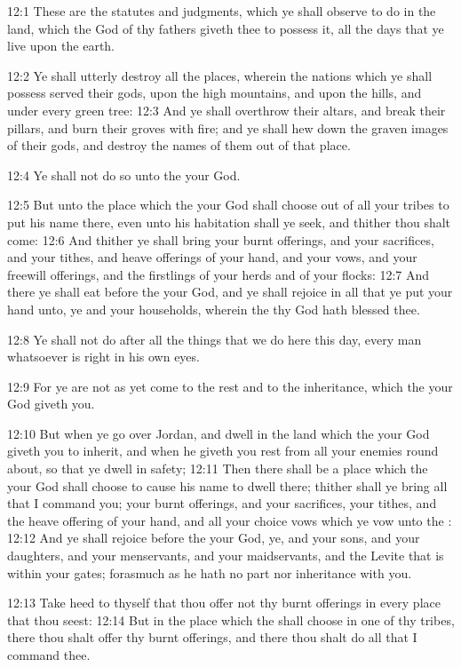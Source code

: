 12:1 These are the statutes and judgments, which ye shall observe to do in the land, which the \LORD God of thy fathers giveth thee to possess it, all the days that ye live upon the earth.

12:2 Ye shall utterly destroy all the places, wherein the nations which ye shall possess served their gods, upon the high mountains, and upon the hills, and under every green tree: 12:3 And ye shall overthrow their altars, and break their pillars, and burn their groves with fire; and ye shall hew down the graven images of their gods, and destroy the names of them out of that place.

12:4 Ye shall not do so unto the \LORD your God.

12:5 But unto the place which the \LORD your God shall choose out of all your tribes to put his name there, even unto his habitation shall ye seek, and thither thou shalt come: 12:6 And thither ye shall bring your burnt offerings, and your sacrifices, and your tithes, and heave offerings of your hand, and your vows, and your freewill offerings, and the firstlings of your herds and of your flocks: 12:7 And there ye shall eat before the \LORD your God, and ye shall rejoice in all that ye put your hand unto, ye and your households, wherein the \LORD thy God hath blessed thee.

12:8 Ye shall not do after all the things that we do here this day, every man whatsoever is right in his own eyes.

12:9 For ye are not as yet come to the rest and to the inheritance, which the \LORD your God giveth you.

12:10 But when ye go over Jordan, and dwell in the land which the \LORD your God giveth you to inherit, and when he giveth you rest from all your enemies round about, so that ye dwell in safety; 12:11 Then there shall be a place which the \LORD your God shall choose to cause his name to dwell there; thither shall ye bring all that I command you; your burnt offerings, and your sacrifices, your tithes, and the heave offering of your hand, and all your choice vows which ye vow unto the \LORD: 12:12 And ye shall rejoice before the \LORD your God, ye, and your sons, and your daughters, and your menservants, and your maidservants, and the Levite that is within your gates; forasmuch as he hath no part nor inheritance with you.

12:13 Take heed to thyself that thou offer not thy burnt offerings in every place that thou seest: 12:14 But in the place which the \LORD shall choose in one of thy tribes, there thou shalt offer thy burnt offerings, and there thou shalt do all that I command thee.


